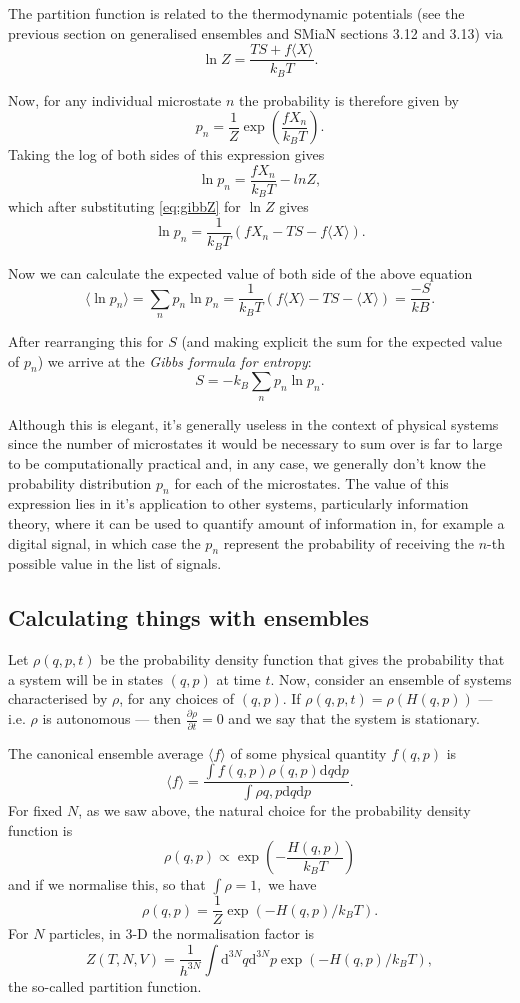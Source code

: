 The partition function is related to the thermodynamic potentials (see the previous section on generalised ensembles and SMiaN sections 3.12 and 3.13) via
\begin{equation}
	\ln Z = \frac{TS+f\langle X\rangle}{k_BT}.
	\label{eq:gibbZ}
\end{equation}

Now, for any individual microstate $n$ the probability is therefore given by
$$
	p_n = \frac{1}{Z}\exp\left(\frac{fX_n}{k_BT}\right).
$$
Taking the log of both sides of this expression gives
$$
	\ln p_n = \frac{fX_n}{k_BT} - ln Z,
$$
which after substituting \ref{eq:gibbZ} for $\ln Z$ gives
$$
	\ln p_n = \frac{1}{k_BT}(fX_n -TS -f\langle X\rangle).
$$

Now we can calculate the expected value of both side of the above equation
$$
	\langle \ln p_n \rangle = \sum_n p_n\ln p_n = \frac{1}{k_BT}(f\langle X\rangle -TS -\langle X \rangle) = \frac{-S}{kB}.
$$

After rearranging this for $S$ (and making explicit the sum for the expected value of $p_n$) we arrive at the \emph{Gibbs formula for entropy}:
$$
	S = -k_B\sum_np_n\ln p_n.
$$

Although this is elegant, it's generally useless in the context of physical systems since the number of microstates it would be necessary to sum over is far to large to be computationally practical and, in any case, we generally don't know the probability distribution $p_n$ for each of the microstates. The value of this expression lies in it's application to other systems, particularly information theory, where it can be used to quantify amount of information in, for example a digital signal, in which case the $p_n$ represent the probability of receiving the $n$-th possible value in the list of signals.

\subsection{Calculating things with ensembles}
Let $\rho(q,p,t)$ be the probability density function that gives the probability that a system will be in states $(q,p)$ at time $t$. Now, consider an ensemble of systems characterised by $\rho$, for any choices of $(q,p)$. If $\rho(q,p,t) = \rho(H(q,p))$ --- i.e. $\rho$ is autonomous --- then $\frac{\partial \rho}{\partial t}=0$ and we say that the system is stationary.

The canonical ensemble average $\langle f\rangle$ of some physical quantity $f(q,p)$ is
$$
	 \langle f\rangle = \frac{\int f(q,p)\rho(q,p)\mathrm{d}q\mathrm{d}p}{\int\rho{q,p}\mathrm{d}q\mathrm{d}p}.
$$
For fixed $N$, as we saw above, the natural choice for the probability density function is 
$$
\rho(q,p) \propto \exp\left(-\frac{H(q,p)}{k_BT}\right)
$$ 
and if we normalise this, so that $\int \rho =1,$ we have
$$
	\rho(q,p) = \frac{1}{Z}\exp\left(-H(q,p)/k_BT\right).
$$
For $N$ particles, in 3-D the normalisation factor is
$$
	Z(T,N,V) = \frac{1}{h^{3N}}\int\mathrm{d}^{3N}q\mathrm{d}^{3N}p\exp(-H(q,p)/k_BT),
$$
the so-called partition function.


